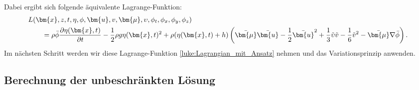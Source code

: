 Dabei ergibt sich folgende äquivalente Lagrange-Funktion:
\begin{align}
&L(\bm{x},z,t,\eta,\phi,\bm{u}, v, \bm{\mu},\upsilon,\phi_t,\phi_x,\phi_y,\phi_z)
\notag
\\
&\qquad=
	\rho\bar{\phi}\frac{\partial \eta(\bm{x}, t)}{\partial t}
	-
	\frac{1}{2} \rho g \eta(\bm{x}, t)^2
	+
	\rho(\eta(\bm{x}, t) + h)
	\left(
	\bar{\bm{\mu}}\bar{\bm{u}}
	-
	\frac{1}{2} \bar{\bm{u}}^2 
	+
	\frac{1}{3} \tilde{\upsilon}\tilde{v}
	-
	\frac{1}{6}\tilde{v}^2
	-
	\bar{\bm{\mu}}\nabla \bar{\phi}
	\right).
	\label{luke:Lagrangian_mit_Ansatz}
\end{align}
Im nächsten Schritt werden wir diese Lagrange-Funktion \eqref{luke:Lagrangian_mit_Ansatz} nehmen und das Variationsprinzip anwenden.

\subsection{Berechnung der unbeschränkten Lösung}

